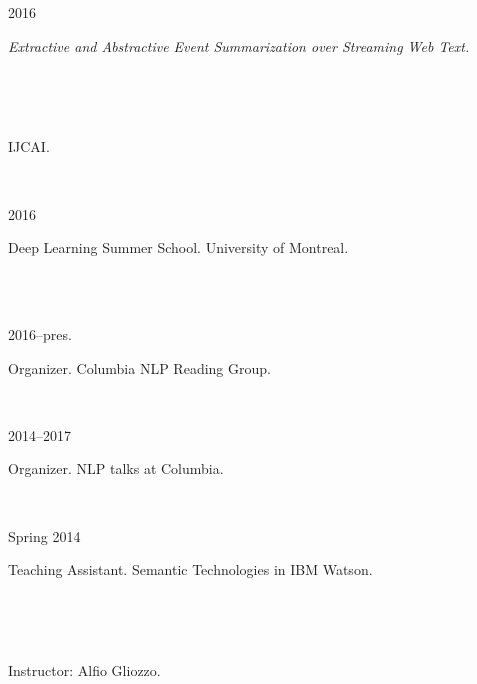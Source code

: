 \documentclass{scrartcl}
\newcommand{\MarginSection}[1]{\marginpar{#1}}
\begin{document}
\begin{cv}{}
{\noindent\parbox{6em}{2016}  \textit{Extractive and Abstractive Event Summarization over Streaming Web Text.}} \\
 {\noindent\parbox{6em}{~~~~} \noindent  IJCAI.}

~\\
\pagebreak

\MarginSection{~\\Summer\\Schools}

{\noindent\parbox{6em}{2016}  Deep Learning Summer School. University of Montreal.} \\ ~\\


\MarginSection{~\\Community\\Service}

{\noindent\parbox{6em}{2016--pres.}  Organizer. Columbia NLP Reading Group.} \\
{\noindent\parbox{6em}{2014--2017}  Organizer. NLP talks at Columbia.} \\
 

\MarginSection{~\\Teaching\\Experience}

{\noindent\parbox{6em}{Spring 2014}  Teaching Assistant. Semantic Technologies in IBM Watson.}\\
{\noindent\parbox{6em}{~~~~~~~~~~~}  Instructor: Alfio Gliozzo.}

~\\ ~\\

\date{}

\end{cv}
\end{document}

